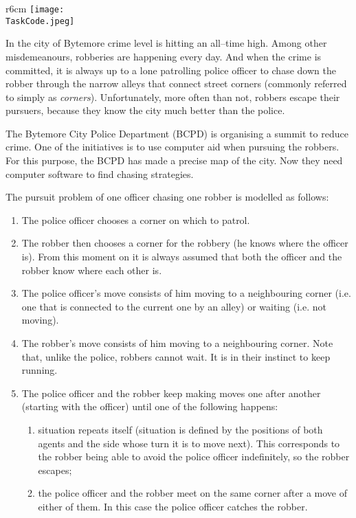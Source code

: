 \documentclass{boi2014}
\renewcommand{\TaskCode}{coprobber}
\begin{document}
    \begin{wrapfigure}{r}{6cm}
		\texttt{[image: \\TaskCode.jpeg]}
	\end{wrapfigure}

    In the city of Bytemore crime level is hitting an all--time high.
    Among other misdemeanours, robberies are happening every day.
    And when the crime is committed, it is always up to a lone patrolling
    police officer to chase down the robber through the narrow alleys
    that connect street corners (commonly referred to simply as
    \emph{corners}). Unfortunately, more often than not, robbers escape
    their pursuers, because they know the city much better than
    the police.

    The Bytemore City Police Department (BCPD) is organising a summit
    to reduce crime. One of the initiatives is to use computer aid when
    pursuing the robbers. For this purpose, the BCPD has made a precise
    map of the city. Now they need computer software to find chasing
    strategies.

    The pursuit problem of one officer chasing one robber is modelled
    as follows:
    \begin{enumerate}
        \item The police officer chooses a corner on which to patrol.
        \item The robber then chooses a corner for the robbery
            (he knows where the officer is). From this moment on it
            is always assumed that both the officer and the robber
            know where each other is.
        \item The police officer's move consists of him moving to a
            neighbouring corner (i.e. one that is connected to the
            current one by an alley) or waiting (i.e. not moving).
        \item The robber's move consists of him moving to a neighbouring
            corner. Note that, unlike the police, robbers cannot wait.
            It is in their instinct to keep running.
        \item The police officer and the robber keep making moves one after
        another (starting with the officer) until one of the following
        happens:
        \begin{enumerate}
            \item situation repeats itself (situation is defined
                by the positions of both agents and the side whose turn
                it is to move next). This corresponds to the robber being
                able to avoid the police officer indefinitely, so the
                robber escapes;
            \item the police officer and the robber meet on the same corner
                after a move of either of them. In this case the police officer
                catches the robber.
        \end{enumerate}
    \end{enumerate}
\end{document}

